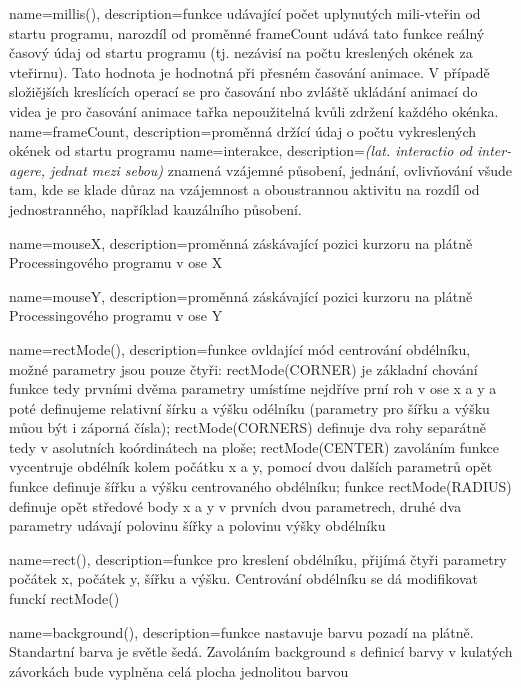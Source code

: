 {
  name={millis()},
  description={funkce udávající počet uplynutých mili-vteřin od startu programu, narozdíl od proměnné frameCount udává tato funkce reálný časový údaj od startu programu (tj. nezávisí na počtu kreslených okének za vteřirnu). Tato hodnota je hodnotná při přesném časování animace. V případě složiějších kreslících operací se pro časování nbo zvláště ukládání animací do videa je pro časování animace tařka nepoužitelná kvůli zdržení každého okénka.}
}
{ 
  name={frameCount},
  description={proměnná držící údaj o počtu vykreslených okének od startu programu}
}
{
  name={interakce},
  description={{\em (lat. interactio od inter-agere, jednat mezi sebou)} znamená vzájemné působení, jednání, ovlivňování všude tam, kde se klade důraz na vzájemnost a oboustrannou aktivitu na rozdíl od jednostranného, například kauzálního působení.}
}

{
  name={mouseX},
  description={proměnná záskávající pozici kurzoru na plátně Processingového programu v ose X}
}

{
  name={mouseY},
  description={proměnná záskávající pozici kurzoru na plátně Processingového programu v ose Y}
}

{
  name={rectMode()},
  description={funkce ovldající mód centrování obdélníku, možné parametry jsou pouze čtyři:  rectMode(CORNER) je základní chování funkce  tedy prvními dvěma parametry umístíme nejdříve prní roh v ose x a y a poté definujeme relativní šírku a výšku odélníku (parametry pro šířku a výšku můou být i záporná čísla); rectMode(CORNERS) definuje dva rohy separátně tedy v asolutních koórdinátech na ploše; rectMode(CENTER) zavoláním funkce  vycentruje obdélník kolem počátku x a y, pomocí dvou dalších parametrů opět funkce  definuje šířku a výšku centrovaného obdélníku; funkce rectMode(RADIUS) definuje opět středové body x a y v prvních dvou parametrech, druhé dva parametry udávají polovinu šířky a polovinu výšky obdélníku}
}

{
  name={rect()},
  description={funkce pro kreslení obdélníku, přijímá čtyři parametry počátek x, počátek y, šířku a výšku. Centrování obdélníku se dá modifikovat funckí rectMode()}
}

{
  name={background()},
  description={funkce nastavuje barvu pozadí na plátně. Standartní barva je světle šedá. Zavoláním background s definicí barvy v kulatých závorkách bude vyplněna celá plocha jednolitou barvou}
}


